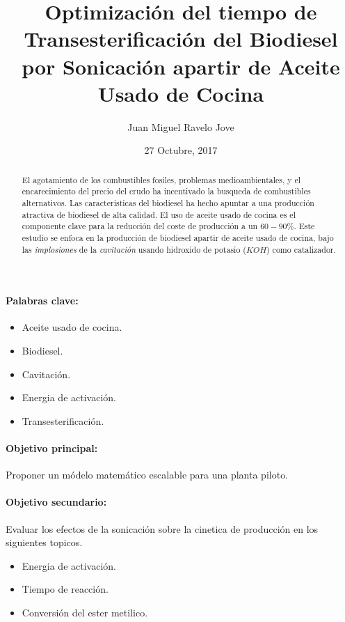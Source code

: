 \documentclass[a4paper,10pt]{article}
\title{Optimizaci\'on del tiempo de Transesterificaci\'on del Biodiesel por Sonicaci\'on apartir de Aceite Usado de Cocina}
\author{Juan Miguel Ravelo Jove}
\date{27 Octubre, 2017}
\begin{document}
\maketitle

\begin{abstract}
El agotamiento de los combustibles fosiles, problemas medioambientales, y el encarecimiento del precio del crudo ha incentivado 
la busqueda de combustibles alternativos. Las caracteristicas del biodiesel ha hecho apuntar a una producción atractiva de biodiesel 
de alta calidad. El uso de aceite usado de cocina es el componente clave para la reducción del coste de producción a un $60-90\%$. Este
estudio se enfoca en la producción de biodiesel apartir de aceite usado de cocina, bajo las \emph{implosiones} de 
la \emph{cavitación} usando hidroxido de potasio ($KOH$)  como catalizador.
\end{abstract}

\paragraph{Palabras clave:} 
\begin{itemize}
 \item Aceite usado de cocina.
 \item Biodiesel.
 \item Cavitación.
 \item Energia de activación.
 \item Transesterificación.
\end{itemize}

\paragraph{Objetivo principal:}
Proponer un m\'odelo matem\'atico escalable para una planta piloto.
\paragraph{Objetivo secundario:}
Evaluar los efectos de la sonicación sobre la cinetica de producción en los siguientes topicos.
\begin{itemize}
 \item Energia de activaci\'on.
 \item Tiempo de reacción.
 \item Conversión del ester metilico.
\end{itemize}
\end{document}
